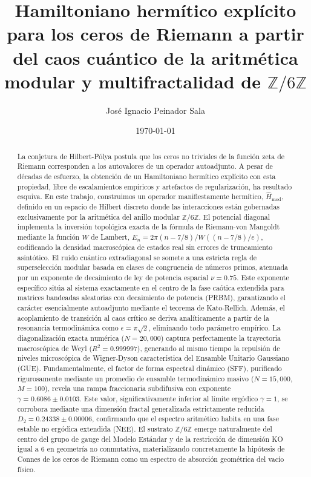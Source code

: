 \documentclass[aps,prl,preprint,superscriptaddress,floatfix]{revtex4-2}
\newcommand{\Zmod}{\mathbb{Z}/6\mathbb{Z}}
\begin{document}
\title{Hamiltoniano hermítico explícito para los ceros de Riemann a partir del caos cuántico de la aritmética modular y multifractalidad de \texorpdfstring{$\Zmod$}{Z/6Z}}

\author{José Ignacio Peinador Sala }

\date{\today}

\begin{abstract}
La conjetura de Hilbert-Pólya postula que los ceros no triviales de la función zeta de Riemann corresponden a los autovalores de un operador autoadjunto. A pesar de décadas de esfuerzo, la obtención de un Hamiltoniano hermítico explícito con esta propiedad, libre de escalamientos empíricos y artefactos de regularización, ha resultado esquiva. En este trabajo, construimos un operador manifiestamente hermítico, $\hat{H}_{\text{mod}}$, definido en un espacio de Hilbert discreto donde las interacciones están gobernadas exclusivamente por la aritmética del anillo modular $\mathbb{Z}/6\mathbb{Z}$. El potencial diagonal implementa la inversión topológica exacta de la fórmula de Riemann-von Mangoldt mediante la función $W$ de Lambert, $E_n = 2\pi (n - 7/8) / W((n - 7/8)/e)$, codificando la densidad macroscópica de estados real sin errores de truncamiento asintótico. El ruido cuántico extradiagonal se somete a una estricta regla de superselección modular basada en clases de congruencia de números primos, atenuada por un exponente de decaimiento de ley de potencia espacial $\nu = 0.75$. Este exponente específico sitúa al sistema exactamente en el centro de la fase caótica extendida para matrices bandeadas aleatorias con decaimiento de potencia (PRBM), garantizando el carácter esencialmente autoadjunto mediante el teorema de Kato-Rellich. Además, el acoplamiento de transición al caos crítico se deriva analíticamente a partir de la resonancia termodinámica como $\epsilon = \pi \sqrt{2}$, eliminando todo parámetro empírico. La diagonalización exacta numérica ($N=20,000$) captura perfectamente la trayectoria macroscópica de Weyl ($R^2 = 0.999997$), generando al mismo tiempo la repulsión de niveles microscópica de Wigner-Dyson característica del Ensamble Unitario Gaussiano (GUE). Fundamentalmente, el factor de forma espectral dinámico (SFF), purificado rigurosamente mediante un promedio de ensamble termodinámico masivo ($N=15,000$, $M=100$), revela una rampa fraccionaria subdifusiva con exponente $\gamma = 0.6086 \pm 0.0103$. Este valor, significativamente inferior al límite ergódico $\gamma=1$, se corrobora mediante una dimensión fractal generalizada estrictamente reducida $D_2 = 0.24338 \pm 0.00006$, confirmando que el espectro aritmético habita en una fase estable no ergódica extendida (NEE). El sustrato $\Zmod$ emerge naturalmente del centro del grupo de gauge del Modelo Estándar y de la restricción de dimensión KO igual a 6 en geometría no conmutativa, materializando concretamente la hipótesis de Connes de los ceros de Riemann como un espectro de absorción geométrica del vacío físico.
\end{abstract}
\end{document}
